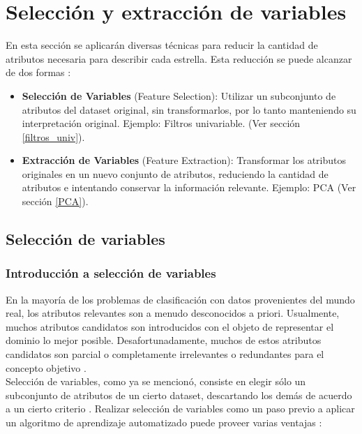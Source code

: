 \chapter{Selección y extracción de variables}

En esta sección se aplicarán diversas técnicas para reducir la cantidad de atributos necesaria para describir cada estrella. Esta reducción se puede alcanzar de dos formas \cite{fs4}:

\begin{itemize}

\item \textbf{Selección de Variables} (Feature Selection): Utilizar un subconjunto de atributos del dataset original, sin transformarlos, por lo tanto manteniendo su interpretación original. Ejemplo: Filtros univariable. (Ver sección \ref{filtros_univ}).
\item \textbf{Extracción de Variables} (Feature Extraction): Transformar los atributos originales en un nuevo conjunto de atributos, reduciendo la cantidad de atributos e intentando conservar la información relevante. Ejemplo: PCA (Ver sección \ref{PCA}).
\end{itemize} 

\section{Selección de variables}
\subsection{Introducción a selección de variables}


En la mayoría de los problemas de clasificación con datos provenientes del mundo real, los atributos relevantes son a menudo desconocidos a priori. Usualmente, muchos atributos candidatos son introducidos con el objeto de representar el dominio lo mejor posible. Desafortunadamente, muchos de estos atributos candidatos son parcial o completamente irrelevantes o redundantes para el concepto objetivo \cite{fs2}.  \\ 

Selección de variables, como ya se mencionó, consiste en elegir sólo un subconjunto de atributos de un cierto dataset, descartando los demás de acuerdo a un cierto criterio \cite{fs1}. Realizar selección de variables como un paso previo a aplicar un algoritmo de aprendizaje automatizado puede proveer varias ventajas \cite{fs3}:


